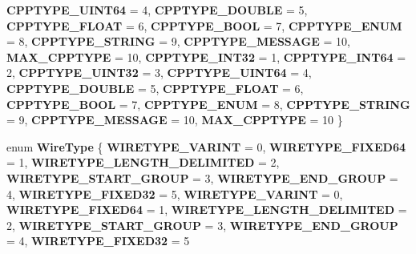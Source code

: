 \begin{DoxyCompactItemize}
{\bfseries C\+P\+P\+T\+Y\+P\+E\+\_\+\+U\+I\+N\+T64} = 4, 
\newline
{\bfseries C\+P\+P\+T\+Y\+P\+E\+\_\+\+D\+O\+U\+B\+LE} = 5, 
{\bfseries C\+P\+P\+T\+Y\+P\+E\+\_\+\+F\+L\+O\+AT} = 6, 
{\bfseries C\+P\+P\+T\+Y\+P\+E\+\_\+\+B\+O\+OL} = 7, 
{\bfseries C\+P\+P\+T\+Y\+P\+E\+\_\+\+E\+N\+UM} = 8, 
\newline
{\bfseries C\+P\+P\+T\+Y\+P\+E\+\_\+\+S\+T\+R\+I\+NG} = 9, 
{\bfseries C\+P\+P\+T\+Y\+P\+E\+\_\+\+M\+E\+S\+S\+A\+GE} = 10, 
{\bfseries M\+A\+X\+\_\+\+C\+P\+P\+T\+Y\+PE} = 10, 
{\bfseries C\+P\+P\+T\+Y\+P\+E\+\_\+\+I\+N\+T32} = 1, 
\newline
{\bfseries C\+P\+P\+T\+Y\+P\+E\+\_\+\+I\+N\+T64} = 2, 
{\bfseries C\+P\+P\+T\+Y\+P\+E\+\_\+\+U\+I\+N\+T32} = 3, 
{\bfseries C\+P\+P\+T\+Y\+P\+E\+\_\+\+U\+I\+N\+T64} = 4, 
{\bfseries C\+P\+P\+T\+Y\+P\+E\+\_\+\+D\+O\+U\+B\+LE} = 5, 
\newline
{\bfseries C\+P\+P\+T\+Y\+P\+E\+\_\+\+F\+L\+O\+AT} = 6, 
{\bfseries C\+P\+P\+T\+Y\+P\+E\+\_\+\+B\+O\+OL} = 7, 
{\bfseries C\+P\+P\+T\+Y\+P\+E\+\_\+\+E\+N\+UM} = 8, 
{\bfseries C\+P\+P\+T\+Y\+P\+E\+\_\+\+S\+T\+R\+I\+NG} = 9, 
\newline
{\bfseries C\+P\+P\+T\+Y\+P\+E\+\_\+\+M\+E\+S\+S\+A\+GE} = 10, 
{\bfseries M\+A\+X\+\_\+\+C\+P\+P\+T\+Y\+PE} = 10
 \}
\item 
\mbox{\label{classgoogle_1_1protobuf_1_1internal_1_1WireFormatLite_a07e74817dc05ab0327283186fb9d96f9}} 
enum {\bfseries Wire\+Type} \{ \newline
{\bfseries W\+I\+R\+E\+T\+Y\+P\+E\+\_\+\+V\+A\+R\+I\+NT} = 0, 
{\bfseries W\+I\+R\+E\+T\+Y\+P\+E\+\_\+\+F\+I\+X\+E\+D64} = 1, 
{\bfseries W\+I\+R\+E\+T\+Y\+P\+E\+\_\+\+L\+E\+N\+G\+T\+H\+\_\+\+D\+E\+L\+I\+M\+I\+T\+ED} = 2, 
{\bfseries W\+I\+R\+E\+T\+Y\+P\+E\+\_\+\+S\+T\+A\+R\+T\+\_\+\+G\+R\+O\+UP} = 3, 
\newline
{\bfseries W\+I\+R\+E\+T\+Y\+P\+E\+\_\+\+E\+N\+D\+\_\+\+G\+R\+O\+UP} = 4, 
{\bfseries W\+I\+R\+E\+T\+Y\+P\+E\+\_\+\+F\+I\+X\+E\+D32} = 5, 
{\bfseries W\+I\+R\+E\+T\+Y\+P\+E\+\_\+\+V\+A\+R\+I\+NT} = 0, 
{\bfseries W\+I\+R\+E\+T\+Y\+P\+E\+\_\+\+F\+I\+X\+E\+D64} = 1, 
\newline
{\bfseries W\+I\+R\+E\+T\+Y\+P\+E\+\_\+\+L\+E\+N\+G\+T\+H\+\_\+\+D\+E\+L\+I\+M\+I\+T\+ED} = 2, 
{\bfseries W\+I\+R\+E\+T\+Y\+P\+E\+\_\+\+S\+T\+A\+R\+T\+\_\+\+G\+R\+O\+UP} = 3, 
{\bfseries W\+I\+R\+E\+T\+Y\+P\+E\+\_\+\+E\+N\+D\+\_\+\+G\+R\+O\+UP} = 4, 
{\bfseries W\+I\+R\+E\+T\+Y\+P\+E\+\_\+\+F\+I\+X\+E\+D32} = 5

\end{DoxyCompactItemize}

